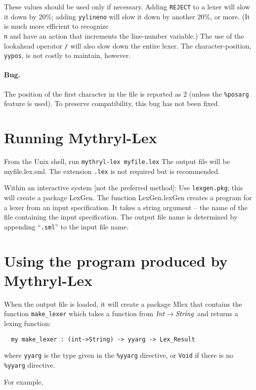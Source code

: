 These values should be used only if necessary.  Adding {\tt REJECT} to a
lexer will slow it down by 20\%; adding {\tt yylineno} will slow it down by
another 20\%, or more.  (It is much more efficient to 
recognize {\tt \\n} and
have an action that increments the line-number variable.)  The use of
the lookahead operator {\tt /} will also slow down the entire lexer.
The character-position, {\tt yypos}, is not costly to maintain, however.

\paragraph{Bug.} The position of the first character in the file
is reported as 2 (unless the {\tt \%posarg} feature is used).
To preserve compatibility, this bug has not been fixed.

\section{Running Mythryl-Lex}

From the Unix shell, run    {\tt mythryl-lex~myfile.lex}
The output file will be myfile.lex.sml.  The extension {\tt .lex} is not
required but is recommended.

Within an interactive system [not the preferred method]:
Use {\tt lexgen.pkg}; this will create a package LexGen.  The function
LexGen.lexGen creates a program for a lexer from an input
specification.  It takes a string argument -- the name of the file
containing the input specification.  The output file name is
determined by appending ``{\tt .sml}'' to the input file name.

\section{Using the program produced by Mythryl-Lex}

When the output file is loaded, it will create a package Mlex that
contains the function {\tt make_lexer} which takes a function from
${\it Int} \rightarrow {\it String}$ and returns a lexing function:

\begin{verbatim}
  my make_lexer : (int->String) -> yyarg -> Lex_Result
\end{verbatim}
where {\tt yyarg} is the type given in the {\tt \%yyarg} directive,
or {\tt Void} if there is no {\tt \%yyarg} directive.

For example,

